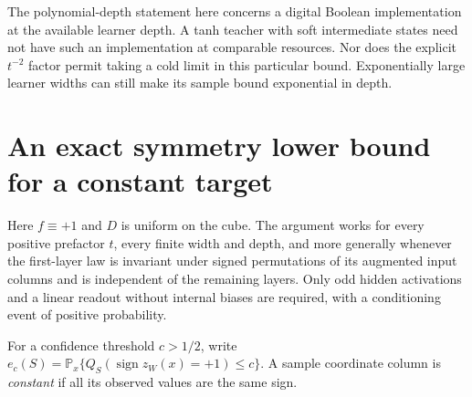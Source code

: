 \documentclass[11pt]{article}
\theoremstyle{remark}\newtheorem{remark}[theorem]{Remark}
\newcommand{\Prb}{\mathbb P}
\begin{document}
The polynomial-depth statement here concerns a digital Boolean
implementation at the available learner depth. A tanh teacher
with soft intermediate states need not have such an implementation
at comparable resources. Nor does the explicit $t^{-2}$ factor
permit taking a cold limit in this particular bound. Exponentially
large learner widths can still make its sample bound exponential
in depth.

\section{An exact symmetry lower bound for a constant target}

Here $f\equiv+1$ and $D$ is uniform on the cube. The argument works
for every positive prefactor $t$, every finite width and depth, and
more generally whenever the first-layer law is invariant under signed
permutations of its augmented input columns and is independent of the
remaining layers. Only odd hidden activations and a linear readout
without internal biases are required, with a conditioning event of
positive probability.

For a confidence threshold $c>1/2$, write
$e_c(S)=\Prb_x\{Q_S(\operatorname{sign}z_W(x)=+1)\le c\}$.
A sample coordinate column is \emph{constant} if all its observed
values are the same sign.
\end{document}
